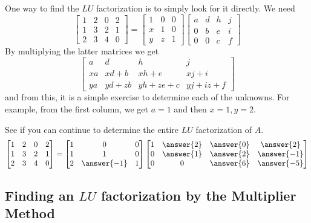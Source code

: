 \documentclass{ximera}
\begin{document}
One way to find the $LU$ factorization%
 is to simply look for it directly.
We need
\[
\begin{bmatrix}
1 & 2 & 0 & 2 \\
1 & 3 & 2 & 1 \\
2 & 3 & 4 & 0
\end{bmatrix}
=
\begin{bmatrix}
1 & 0 & 0 \\
x & 1 & 0 \\
y & z & 1
\end{bmatrix} 
\begin{bmatrix}
a & d & h & j \\
0 & b & e & i \\
0 & 0 & c & f
\end{bmatrix}
\]
By multiplying the latter matrices we get
\[
\begin{bmatrix}
a & d & h & j \\
xa & xd+b & xh+e & xj+i \\
ya & yd+zb & yh+ze+c & yj+iz+f
\end{bmatrix}
\]
and from this, it is a simple exercise to determine each of the unknowns. For example, from the first
column, we get $a=1$ and then $x=1,y=2.$ 


See if you can continue to determine the entire $LU$
factorization of $A$.
\[
\begin{bmatrix}
1 & 2 & 0 & 2 \\
1 & 3 & 2 & 1 \\
2 & 3 & 4 & 0
\end{bmatrix}
=
\begin{bmatrix}
1 & 0 & 0 \\
1 & 1 & 0 \\
2 & \answer{-1} & 1
\end{bmatrix} 
\begin{bmatrix}
1 & \answer{2} & \answer{0} & \answer{2} \\
0 & \answer{1} & \answer{2} & \answer{-1} \\
0 & 0 & \answer{6} & \answer{-5}
\end{bmatrix}
\]

\subsection*{Finding an $LU$ factorization by the Multiplier Method}
\end{document}
